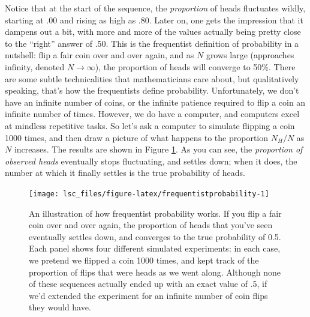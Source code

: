 \documentclass[
]{book}
\theoremstyle{definition}
\theoremstyle{definition}
\theoremstyle{definition}
\theoremstyle{definition}
\theoremstyle{remark}
\begin{document}
Notice that at the start of the sequence, the \emph{proportion} of heads fluctuates wildly, starting at .00 and rising as high as .80. Later on, one gets the impression that it dampens out a bit, with more and more of the values actually being pretty close to the ``right'' answer of .50. This is the frequentist definition of probability in a nutshell: flip a fair coin over and over again, and as \(N\) grows large (approaches infinity, denoted \(N\rightarrow \infty\)), the proportion of heads will converge to 50\%. There are some subtle technicalities that mathematicians care about, but qualitatively speaking, that's how the frequentists define probability. Unfortunately, we don't have an infinite number of coins, or the infinite patience required to flip a coin an infinite number of times. However, we do have a computer, and computers excel at mindless repetitive tasks. So let's ask a computer to simulate flipping a coin 1000 times, and then draw a picture of what happens to the proportion \(N_H / N\) as \(N\) increases. The results are shown in Figure \ref{fig:frequentistprobability}. As you can see, the \emph{proportion of observed heads} eventually stops fluctuating, and settles down; when it does, the number at which it finally settles is the true probability of heads.

\begin{figure}

{\centering \texttt{[image: lsc\_files/figure-latex/frequentistprobability-1]} 

}

\caption{An illustration of how frequentist probability works. If you flip a fair coin over and over again, the proportion of heads that you've seen eventually settles down, and converges to the true probability of 0.5. Each panel shows four different simulated experiments: in each case, we pretend we flipped a coin 1000 times, and kept track of the proportion of flips that were heads as we went along. Although none of these sequences actually ended up with an exact value of .5, if we'd extended the experiment for an infinite number of coin flips they would have.}\label{fig:frequentistprobability}
\end{figure}
\end{document}
